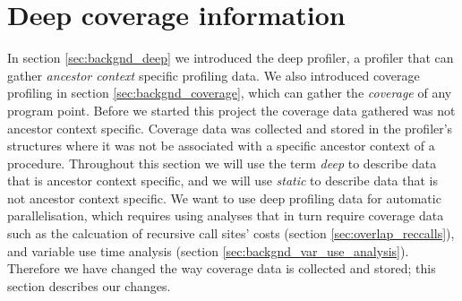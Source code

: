 \section{Deep coverage information}
\label{sec:overlap_coverage}


In section \ref{sec:backgnd_deep} we introduced the deep profiler,
a profiler that can gather \emph{ancestor context} specific profiling data.
We also introduced coverage profiling in section \ref{sec:backgnd_coverage},
which can gather the \emph{coverage} of any program point.
Before we started this project the coverage data gathered was not ancestor
context specific.
Coverage data was collected and stored in the profiler's \PS
structures where it was not be associated with a specific ancestor context of
a procedure.
Throughout this section we will use the term \emph{deep} to describe data
that is ancestor context specific,
and we will use \emph{static} to describe data that is not ancestor
context specific.
We want to use deep profiling data for automatic parallelisation,
which requires using analyses that in turn require coverage data such as
the calcuation of recursive call sites' costs
(section \ref{sec:overlap_reccalls}),
and variable use time analysis (section \ref{sec:backgnd_var_use_analysis}).
Therefore we have changed the way coverage data is collected and stored;
this section describes our changes.

